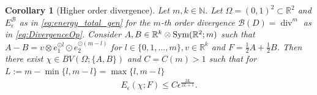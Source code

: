 \documentclass[a4paper, 10pt, twoside, notitlepage]{amsart}
\theoremstyle{plain}
\newtheorem{cor}[prop]{Corollary}
\newcommand{\R}{\mathbb{R}}
\newcommand{\N}{\mathbb{N}}
\DeclareMathOperator{\di}{div}
\begin{document}
                
                  \begin{cor}[Higher order divergence]
                    Let $m, k \in \N$. Let $\Omega = (0,1)^2 \subset \R^2$ and $E_\epsilon^{\mathcal{B}}$ as in \cref{eq:energy_total_gen} for the $m$-th order divergence $\mathcal{B}(D) = \di^m$ as in \cref{eq:DivergenceOp}.
                    Consider $A,B \in \R^k \otimes \textup{Sym}(\R^2;m)$ such that $A-B = v \otimes e_1^{\odot l} \odot e_2^{\odot (m-l)}$ for $l \in \{0,1,\dots,m\}, v\in \R^k$ and $F = \frac{1}{2}A+\frac{1}{2}B$.
                    Then there exist $\chi \in BV(\Omega;\{A,B\})$ and $C = C(m) > 1$ such that for $L := m - \min\{l,m-l\} = \max\{l,m-l\}$  
                    \begin{align*}
                      E_\epsilon(\chi;F) \leq C \epsilon^{\frac{2L}{2L+1}}.
                    \end{align*}
                  \end{cor} 
\end{document}
